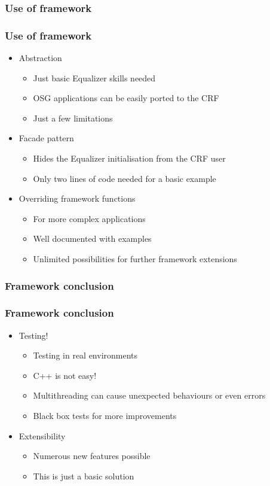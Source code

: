 \subsubsection*{Use of framework}
\begin{frame}\frametitle{Use of framework}
	\begin{itemize}
		\item<1-> Abstraction
		\begin{itemize}
			\item Just basic Equalizer skills needed
			\item OSG applications can be easily ported to the CRF
			\item Just a few limitations
		\end{itemize}
		\item<2-> Facade pattern
		\begin{itemize}
			\item Hides the Equalizer initialisation from the CRF user
			\item Only two lines of code needed for a basic example
		\end{itemize}
		\item<3-> Overriding framework functions
		\begin{itemize}
			\item For more complex applications
			\item Well documented with examples
			\item Unlimited possibilities for further framework extensions
		\end{itemize}
	\end{itemize}
	
\end{frame}

\subsubsection*{Framework conclusion}
\begin{frame}\frametitle{Framework conclusion}
	\begin{itemize}
		\item<1-> Testing!
		\begin{itemize}
			\item Testing in real environments
			\item C++ is not easy!
			\item Multithreading can cause unexpected behaviours or even errors
			\item Black box tests for more improvements
		\end{itemize}
		\item<2-> Extensibility
		\begin{itemize}
			\item Numerous new features possible
			\item This is just a basic solution
		\end{itemize}
	\end{itemize}
\end{frame}
